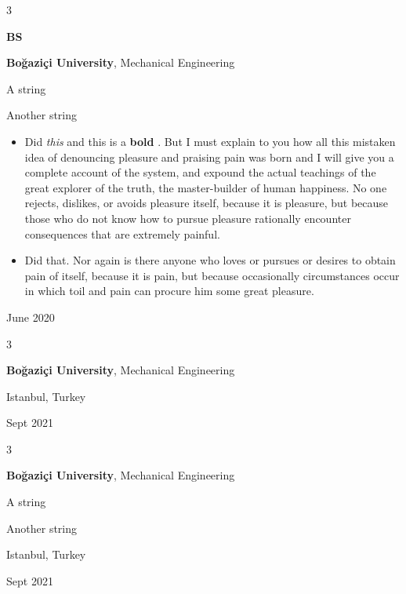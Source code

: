 \documentclass[10pt, letterpaper]{article}
\newenvironment{summary}{
    \begin{description}[
        topsep=0.10 cm,
        parsep=0.10 cm,
        partopsep=0pt,
        itemsep=0pt,
        leftmargin=0.4 cm + 10pt
    ]
}{
    \end{description}
} %
\newenvironment{highlights}{
    \begin{itemize}[
        topsep=0.10 cm,
        parsep=0.10 cm,
        partopsep=0pt,
        itemsep=0pt,
        leftmargin=0.4 cm + 10pt
    ]
}{
    \end{itemize}
} %
\newenvironment{threecolentry}[3][]{
    \onecolentry
    \def\thirdColumn{#3}
    \setcolumnwidth{1 cm, \fill, 4.5 cm}
    \begin{paracol}{3}
    {\raggedright #2} \switchcolumn
}{
    \switchcolumn \raggedleft \thirdColumn
    \end{paracol}
    \endonecolentry
} %
\let\hrefWithoutArrow\href
\renewcommand{\href}[2]{\hrefWithoutArrow{#1}{\ifthenelse{\equal{#2}{}}{ }{#2 }\raisebox{.15ex}{\footnotesize \faExternalLink*}}}
\begin{document}
        \vspace{0.2 cm}

        \begin{threecolentry}{\textbf{BS}}{
            June 2020
        }
            \textbf{Boğaziçi University}, Mechanical Engineering
            \begin{summary}
                \item A string
                \item Another string
            \end{summary}
            \begin{highlights}
                \item Did \textit{this} and this is a \textbf{bold} \href{https://example.com}{link}. But I must explain to you how all this mistaken idea of denouncing pleasure and praising pain was born and I will give you a complete account of the system, and expound the actual teachings of the great explorer of the truth, the master-builder of human happiness. No one rejects, dislikes, or avoids pleasure itself, because it is pleasure, but because those who do not know how to pursue pleasure rationally encounter consequences that are extremely painful.
                \item Did that. Nor again is there anyone who loves or pursues or desires to obtain pain of itself, because it is pain, but because occasionally circumstances occur in which toil and pain can procure him some great pleasure.
            \end{highlights}
        \end{threecolentry}

        \vspace{0.2 cm}

        \begin{threecolentry}{\textbf{}}{
            Istanbul, Turkey

        Sept 2021
        }
            \textbf{Boğaziçi University}, Mechanical Engineering
        \end{threecolentry}

        \vspace{0.2 cm}

        \begin{threecolentry}{\textbf{}}{
            Istanbul, Turkey

        Sept 2021
        }
            \textbf{Boğaziçi University}, Mechanical Engineering
            \begin{summary}
                \item A string
                \item Another string
            \end{summary}
        \end{threecolentry}
\end{document}
